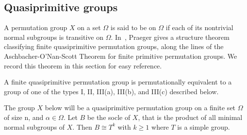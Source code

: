 \subsection{Quasiprimitive groups}
\label{sec:quas-groups}
A permutation group $X$ on a set $\Omega$ is said to be  on
$\Omega$ if each of its nontrivial normal subgroups is transitive on $\Omega$.
In~\cite{Praeger:1993}, Praeger gives a structure theorem classifying finite
quasiprimitive permutation groups, along the lines of the
Aschbacher-O'Nan-Scott Theorem for finite primitive permutation groups.
We record this theorem in this section for easy reference.


\begin{theorem} 
A finite quasiprimitive permutation group is permutationally
equivalent to a group of one of the types I, II, III(a), III(b), and III(c) described below.
\end{theorem}

The group $X$ below will be a quasiprimitive permutation group on a finite set $\Omega$ of size n,
and $\alpha \in \Omega$. Let $B$ be the socle of $X$, that is the product of all
minimal normal subgroups of $X$. Then $B\cong T^k$ with $k \geq 1$ where $T$ is
a simple group. 

